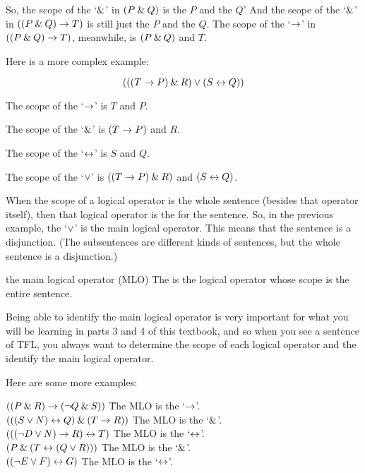 So, the scope of the `$\mathbin{\&}$' in $(P \mathbin{\&} Q)$ is the $P$ and the $Q$' And the scope of the `$\mathbin{\&}$' in $((P \mathbin{\&} Q) \rightarrow T)$ is still just the $P$ and the $Q$. The scope of the `$\rightarrow$' in $((P \mathbin{\&} Q) \rightarrow T)$, meanwhile, is $(P \mathbin{\&} Q)$ and $T$.

Here is a more complex example:

$$(((T \rightarrow P) \mathbin{\&} R) \vee (S \leftrightarrow Q))$$

\begin{ebullet}
	\item[] The scope of the `$\rightarrow$' is $T$ and $P$. 
	\item[] The scope of the `$\mathbin{\&}$' is $(T \rightarrow P)$ and $R$.
	\item[] The scope of the `$\leftrightarrow$' is $S$ and $Q$.
	\item[] The scope of the `$\vee$' is $((T \rightarrow P) \mathbin{\&} R)$ and $(S \leftrightarrow Q)$.
\end{ebullet}

When the scope of a logical operator is the whole sentence (besides that operator itself), then that logical operator is the  for the sentence. So, in the previous example, the `$\vee$' is the main logical operator. This means that the sentence is a disjunction. (The subsentences are different kinds of sentences, but the whole sentence is a disjunction.)

\begin{factboxy}{the main logical operator (MLO)}
The  is the logical operator whose scope is the entire sentence. 
\end{factboxy}

Being able to identify the main logical operator is very important for what you will be learning in parts 3 and 4 of this textbook, and so when you see a sentence of TFL, you always want to determine the scope of each logical operator and the identify the main logical operator. 

Here are some more examples:
\begin{tabbing}
\quad$((P \mathbin{\&} R) \rightarrow ({\neg} Q \mathbin{\&} S))$ \qquad \qquad \qquad \= The MLO is the `$\rightarrow$'.\\\smallskip 
\quad$(((S \vee N) \leftrightarrow Q) \mathbin{\&} (T \rightarrow R))$ \> The MLO is the `$\mathbin{\&}$'.\\\smallskip
\quad$((({\neg} D \vee N) \rightarrow R) \leftrightarrow T)$ \> The MLO is the `$\leftrightarrow$'.\\\smallskip
\quad$(P \mathbin{\&} (T \leftrightarrow (Q \vee R)))$ \> The MLO is the `$\mathbin{\&}$'.\\\smallskip
\quad$(({\neg} E \vee F) \leftrightarrow G)$ \> The MLO is the `$\leftrightarrow$'.
\end{tabbing}



